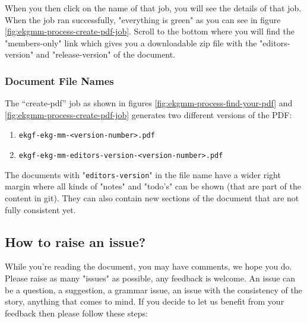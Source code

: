 When you then click on the name of that job, you will see the details of that job.
When the job ran successfully, "everything is green" as you can see in figure
\ref{fig:ekgmm-process-create-pdf-job}.
Scroll to the bottom where you will find the "members-only" link which gives you
a downloadable zip file with the "editors-version" and "release-version" of the document.

\subsubsection{Document File Names}
\label{subsec:ekg-mm-process-document-file-names}

The ``create-pdf'' job as shown in figures \ref{fig:ekgmm-process-find-your-pdf}
and \ref{fig:ekgmm-process-create-pdf-job} generates two different versions of the PDF:

\begin{enumerate}[leftmargin=1.2em,font=\footnotesize]
    \item {\footnotesize\texttt{ekgf-ekg-mm-<version-number>.pdf}}
    \item {\footnotesize\texttt{ekgf-ekg-mm-editors-version-<version-number>.pdf}}
\end{enumerate}

The documents with "\texttt{editors-version}" in the file name have a wider right margin
where all kinds of "notes" and "todo’s" can be shown (that are part of the content in git).
They can also contain new sections of the document that are not fully consistent yet.

\subsection{How to raise an issue?}
\label{subsec:ekg-mm-process-how-to-raise-an-issue}

While you’re reading the document, you may have comments, we hope you do.
Please raise as many "issues" as possible, any feedback is welcome.
An issue can be a question, a suggestion, a grammar issue, 
an issue with the consistency of the story, anything that comes to mind. 
If you decide to let us benefit from your feedback then please follow these steps:

